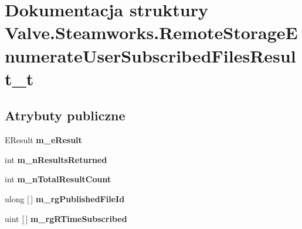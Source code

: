 \hypertarget{struct_valve_1_1_steamworks_1_1_remote_storage_enumerate_user_subscribed_files_result__t}{}\section{Dokumentacja struktury Valve.\+Steamworks.\+Remote\+Storage\+Enumerate\+User\+Subscribed\+Files\+Result\+\_\+t}
\label{struct_valve_1_1_steamworks_1_1_remote_storage_enumerate_user_subscribed_files_result__t}
\subsection*{Atrybuty publiczne}
\begin{DoxyCompactItemize}
\item 
\mbox{\label{struct_valve_1_1_steamworks_1_1_remote_storage_enumerate_user_subscribed_files_result__t_a112956a9bc961456e00056d1cb2f0698}} 
E\+Result {\bfseries m\+\_\+e\+Result}
\item 
\mbox{\label{struct_valve_1_1_steamworks_1_1_remote_storage_enumerate_user_subscribed_files_result__t_a7f7f2543968b81a0720e436354cd528e}} 
int {\bfseries m\+\_\+n\+Results\+Returned}
\item 
\mbox{\label{struct_valve_1_1_steamworks_1_1_remote_storage_enumerate_user_subscribed_files_result__t_a7939af5b6225fcde4ef9f83a62cf80ff}} 
int {\bfseries m\+\_\+n\+Total\+Result\+Count}
\item 
\mbox{\label{struct_valve_1_1_steamworks_1_1_remote_storage_enumerate_user_subscribed_files_result__t_a7d720bff05f4669cf07dec5e242454a3}} 
ulong \mbox{[}$\,$\mbox{]} {\bfseries m\+\_\+rg\+Published\+File\+Id}
\item 
\mbox{\label{struct_valve_1_1_steamworks_1_1_remote_storage_enumerate_user_subscribed_files_result__t_a07bb4d6ea2e7bab293a3ead5b696bde0}} 
uint \mbox{[}$\,$\mbox{]} {\bfseries m\+\_\+rg\+R\+Time\+Subscribed}
\end{DoxyCompactItemize}


